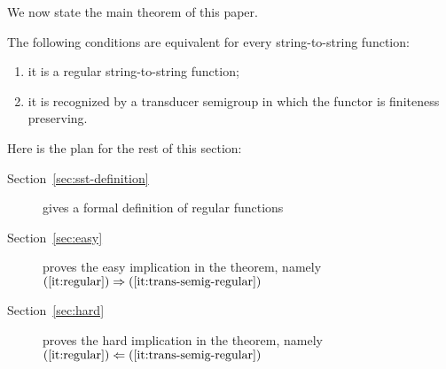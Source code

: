 We now state the main theorem of this paper. 


\begin{theorem}\label{thm:regular-functions}
    The following conditions are equivalent for every string-to-string function:
    \begin{enumerate}
        \item \label{it:regular} it is a regular string-to-string function;
        \item \label{it:trans-semig-regular}it is recognized by a transducer semigroup  in which the functor is finiteness preserving. 
    \end{enumerate}
\end{theorem}

\noindent Here is the plan for the rest of this section:
\begin{description}
    \item[Section~\ref{sec:sst-definition}] gives a formal definition of regular functions
    \item[Section~\ref{sec:easy}] proves the easy  implication in the theorem, namely  $(\ref{it:regular}) \Rightarrow (\ref{it:trans-semig-regular})$
    \item[Section~\ref{sec:hard}] proves the hard  implication in the theorem, namely  $(\ref{it:regular}) \Leftarrow (\ref{it:trans-semig-regular})$
\end{description}

